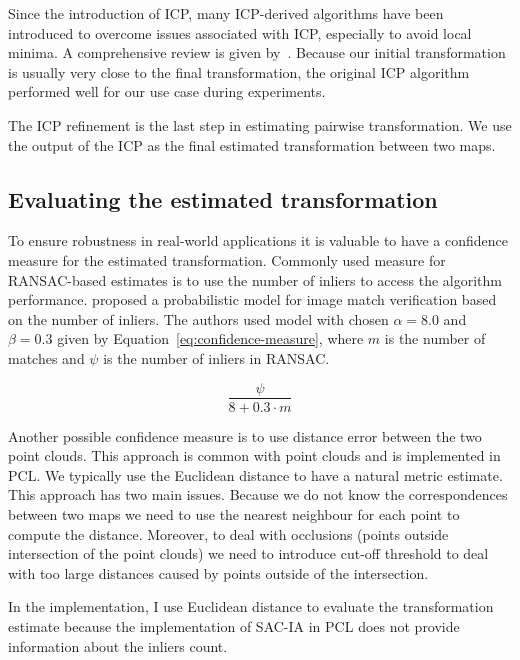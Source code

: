 Since the introduction of \gls{ICP}, many \gls{ICP}-derived algorithms have been introduced to overcome issues associated with \gls{ICP}, especially to avoid local minima. A comprehensive review is given by~\citet{pomerleau2015reviewregistration}. Because our initial transformation is usually very close to the final transformation, the original \gls{ICP} algorithm performed well for our use case during experiments.

The \gls{ICP} refinement is the last step in estimating pairwise transformation. We use the output of the \gls{ICP} as the final estimated transformation between two maps.

\subsection{Evaluating the estimated transformation}
\label{sec:transform-evaluation}

To ensure robustness in real-world applications it is valuable to have a confidence measure for the estimated transformation. Commonly used measure for \gls{RANSAC}-based estimates is to use the number of inliers to access the algorithm performance. \citet{brown2007automatic} proposed a probabilistic model for image match verification based on the number of inliers. The authors used model with chosen $\alpha = 8.0$ and $\beta = 0.3$ given by Equation~\eqref{eq:confidence-measure}, where $m$ is the number of matches and $\psi$ is the number of inliers in \gls{RANSAC}.

\begin{equation}
\label{eq:confidence-measure}
\frac{\psi}{8 + 0.3 \cdot m}
\end{equation}

Another possible confidence measure is to use distance error between the two point clouds. This approach is common with point clouds and is implemented in \gls{PCL}. We typically use the Euclidean distance to have a natural metric estimate. This approach has two main issues. Because we do not know the correspondences between two maps we need to use the nearest neighbour for each point to compute the distance. Moreover, to deal with occlusions (points outside intersection of the point clouds) we need to introduce cut-off threshold to deal with too large distances caused by points outside of the intersection.

In the implementation, I use Euclidean distance to evaluate the transformation estimate because the implementation of \gls{SAC-IA} in \gls{PCL} does not provide information about the inliers count.

